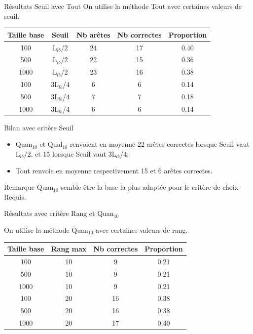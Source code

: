 \documentclass{beamer}
\begin{document}
\begin{frame}{Résultats Seuil avec Tout}
On utilise la méthode Tout avec certaines valeurs de seuil.
\begin{tabular}{|c|c|c|c|c|}
   \hline
   Taille base & Seuil & Nb arêtes & Nb correctes & Proportion\\
   \hline
   100 & L$_{lb}$/2 & 24 & 17 & 0.40  \\
   \hline
   500 & L$_{lb}$/2 & 22 & 15 & 0.36  \\
   \hline
   1000 & L$_{lb}$/2 & 23 & 16 & 0.38  \\
   \hline
   \hline
   100 & 3L$_{lb}$/4 & 6 & 6 & 0.14  \\
   \hline
   500 & 3L$_{lb}$/4 & 7 & 7 & 0.18  \\
   \hline
   1000 & 3L$_{lb}$/4 & 6 & 6 & 0.14  \\
   \hline
\end{tabular}
\end{frame}

\begin{frame}{Bilan avec critère Seuil}

\begin{itemize}
\item Quan$_{10}$ et Qual$_{10}$ renvoient en moyenne 22 arêtes correctes lorsque Seuil vaut L$_{lb}$/2, et 15 lorsque Seuil vaut 3L$_{lb}$/4;
\item Tout renvoie en moyenne respectivement 15 et 6 arêtes correctes.
\end{itemize}

\begin{exampleblock}{Remarque}
Quan$_{10}$ semble être la base la plus adaptée pour le critère de choix Requis.
\end{exampleblock}

\end{frame}

\begin{frame}{Résultats avec critère Rang et Quan$_{10}$}

On utilise la méthode Quan$_{10}$ avec certaines valeurs de rang.
\begin{tabular}{|c|c|c|c|}
   \hline
   Taille base & Rang max & Nb correctes & Proportion\\
   \hline
   100 & 10  & 9 & 0.21  \\
   \hline
   500 & 10  & 9 & 0.21  \\
   \hline
   1000 & 10 & 9 & 0.21  \\
   \hline
   \hline
   100 & 20 & 16 & 0.38  \\
   \hline
   500 & 20 & 16 & 0.38  \\
   \hline
   1000 & 20 & 17 & 0.40  \\
   \hline
\end{tabular}

\end{frame}
\end{document}
